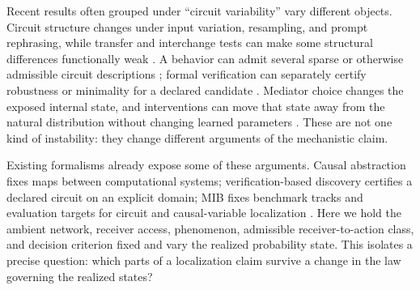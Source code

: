 Recent results often grouped under ``circuit variability'' vary different objects. Circuit structure changes under input variation, resampling, and prompt rephrasing, while transfer and interchange tests can make some structural differences functionally weak \citep{bayat2026many,wu2026variance}. A behavior can admit several sparse or otherwise admissible circuit descriptions \citep{chen2026allcircuits,meloux2025identifiable}; formal verification can separately certify robustness or minimality for a declared candidate \citep{hadad2026formal}. Mediator choice changes the exposed internal state, and interventions can move that state away from the natural distribution without changing learned parameters \citep{mueller2026mediator,grant2026divergent}. These are not one kind of instability: they change different arguments of the mechanistic claim.

Existing formalisms already expose some of these arguments. Causal abstraction fixes maps between computational systems; verification-based discovery certifies a declared circuit on an explicit domain; MIB fixes benchmark tracks and evaluation targets for circuit and causal-variable localization \citep{geiger2025causal,hadad2026formal,mueller2025mib}. Here we hold the ambient network, receiver access, phenomenon, admissible receiver-to-action class, and decision criterion fixed and vary the realized probability state. This isolates a precise question: which parts of a localization claim survive a change in the law governing the realized states?
